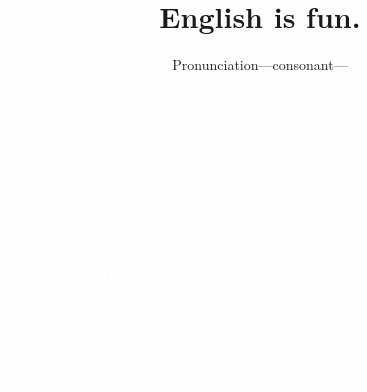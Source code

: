 \documentclass[aspectratio=169,xcolor={dvipsnames,table}]{beamer}
\title{English is fun.}
\subtitle{Pronunciation---consonant---}
\author{}
\institute[]{}
\date[]
\begin{document}
\begin{frame}
\raggedleft
  \textcolor{white}{\Huge\bfseries English is fun.}

\vfill

\raggedleft
 \textcolor{white}{\LARGE\bfseries 2024--10--04}

\vfill
\vfill
\vfill

\raggedleft
\textcolor{white}{\large The lesson will begin at the scheduled time.}
\end{frame}
\begin{frame}
\raggedleft
  \textcolor{white}{\Huge\bfseries Hello, everybody!}

\vfill

\raggedleft
 \textcolor{white}{\Huge\bfseries How are you today?}
\vfill

\raggedleft
 \textcolor{white}{\Huge\bfseries Are you ready to start?}
\vfill
\vfill
\vfill
\raggedleft
 \textcolor{white}{\Large\bfseries 2024--10--04}
\hypertarget{top_page}{}
\hyperlink{today}{}
\end{frame}
\begin{frame}
\centering
  \textcolor{white}{\Huge\bfseries Today's Pronunciation}\pause

 \vspace{30pt}

  \textcolor{white}{\Huge\bfseries {}, }
\end{frame}
\end{document}
